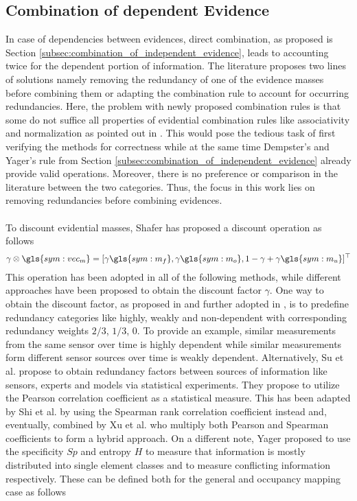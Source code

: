 \subsection{Combination of dependent Evidence}
\label{subsec:combination_of_dependent_evidence}
In case of dependencies between evidences, direct combination, as proposed is Section \ref{subsec:combination_of_independent_evidence}, leads to accounting twice for the dependent portion of information. The literature proposes two lines of solutions namely removing the redundancy of one of the evidence masses before combining them or adapting the combination rule to account for occurring redundancies. Here, the problem with newly proposed combination rules is that some do not suffice all properties of evidential combination rules like associativity and normalization as pointed out in \cite{cattaneo2011belief}. This would pose the tedious task of first verifying the methods for correctness while at the same time Dempster's and Yager's rule from Section \ref{subsec:combination_of_independent_evidence} already provide valid operations. Moreover, there is no preference or comparison in the literature between the two categories. Thus, the focus in this work lies on removing redundancies before combining evidences.
\\\\
To discount evidential masses, Shafer \cite{shafer1976mathematical} has proposed a discount operation as follows
\begin{align}
	\label{eq:discount_op}
	\gamma \otimes \gls{sym:vec_m} = [\gamma \gls{sym:m_f}, \gamma \gls{sym:m_o}, 1-\gamma+\gamma\gls{sym:m_u}]^\top
\end{align}
This operation has been adopted in all of the following methods, while different approaches have been proposed to obtain the discount factor $\gamma$. One way to obtain the discount factor, as proposed in \cite{jiang2009combination} and further adopted in \cite{guralnik2006handling}, is to predefine redundancy categories like highly, weakly and non-dependent with corresponding redundancy weights $2/3$, $1/3$, $0$. To provide an example, similar measurements from the same sensor over time is highly dependent while similar measurements form different sensor sources over time is weakly dependent. Alternatively, Su et al. \cite{su2015handling} propose to obtain redundancy factors between sources of information like sensors, experts and models via statistical experiments. They propose to utilize the Pearson correlation coefficient \cite{benesty2009pearson} as a statistical measure. This has been adapted by Shi et al. \cite{shi2017research} by using the Spearman rank correlation coefficient instead and, eventually, combined by Xu et al. \cite{xu2017dependent} who multiply both Pearson and Spearman coefficients to form a hybrid approach. On a different note, Yager \cite{yager2009fusion} proposed to use the specificity $Sp$ and entropy $H$ to measure that information is mostly distributed into single element classes and to measure conflicting information respectively. These can be defined both for the general and occupancy mapping case as follows
